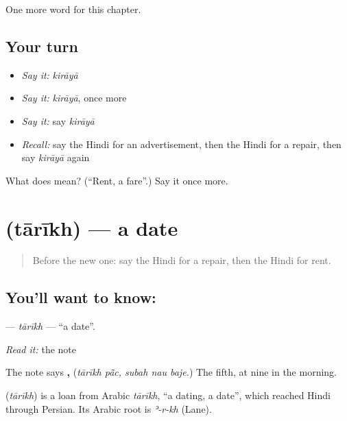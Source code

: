 \begin{grammarlens}[title={What you've built}]
One more word for this chapter.
\end{grammarlens}

\subsection*{Your turn}
\begin{itemize}
\raggedright
  \item \emph{Say it:} \emph{kirāyā}
  \item \emph{Say it:} \emph{kirāyā}, once more
  \item \emph{Say it:} say \emph{kirāyā}
  \item \emph{Recall:} say the Hindi for an advertisement, then the Hindi for a repair, then say \emph{kirāyā} again
\end{itemize}

\begin{tcolorbox}[breakable,colback=teal!4,colframe=teal!35!black,title={Before you move on}]
What does  mean? (\textquotedblleft{}Rent, a fare\textquotedblright{}.) Say it once more.
\end{tcolorbox}
\section[\texorpdfstring{\hi{तारीख़} (tārīkh)}{तारीख़ (tārīkh)}]{ (tārīkh) — a date}

\label{lesson:HI-C167-tarikh}



\begin{quote}
Before the new one: say the Hindi for a repair, then the Hindi for rent.
\end{quote}

\subsection*{You'll want to know: }
\textbf{} — \emph{tārīkh} — \textquotedblleft{}a date\textquotedblright{}.

\emph{Read it:} the note

The note says \textbf{ ,   } (\emph{tārīkh pā̃c, subah nau baje.}) The fifth, at nine in the morning.

\begin{cousinweb}
\textbf{} (\emph{tārīkh}) is a loan from Arabic \emph{tārīkh}, \textquotedblleft{}a dating, a date\textquotedblright{}, which reached Hindi through Persian. Its Arabic root is \emph{ʾ-r-kh} (Lane).
\end{cousinweb}

